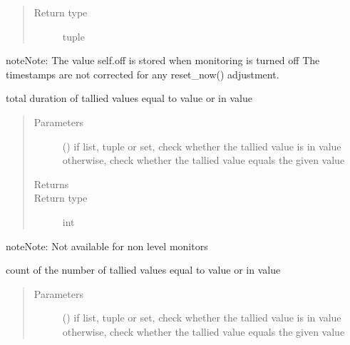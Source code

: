 \documentclass[letterpaper,10pt,english]{sphinxmanual}
\begin{document}
\begin{fulllineitems}
\begin{fulllineitems}
\begin{quote}
\begin{description}
\item[{Return type}] \leavevmode
tuple

\end{description}\end{quote}

\begin{sphinxadmonition}{note}{Note:}
The value self.off is stored when monitoring is turned off 
The timestamps are not corrected for any reset\_now() adjustment.
\end{sphinxadmonition}

\end{fulllineitems}


\begin{fulllineitems}
\label{\detokenize{Reference:salabim.Monitor.value_duration}}
total duration of tallied values equal to value or in value
\begin{quote}\begin{description}
\item[{Parameters}] \leavevmode
{} () \textendash{} if list, tuple or set, check whether the tallied value is in value 
otherwise, check whether the tallied value equals the given value

\item[{Returns}] \leavevmode
{}

\item[{Return type}] \leavevmode
int

\end{description}\end{quote}

\begin{sphinxadmonition}{note}{Note:}
Not available for non level monitors
\end{sphinxadmonition}

\end{fulllineitems}


\begin{fulllineitems}
\label{\detokenize{Reference:salabim.Monitor.value_number_of_entries}}
count of the number of tallied values equal to value or in value
\begin{quote}\begin{description}
\item[{Parameters}] \leavevmode
{} () \textendash{} if list, tuple or set, check whether the tallied value is in value 
otherwise, check whether the tallied value equals the given value


\end{description}
\end{quote}
\end{fulllineitems}
\end{fulllineitems}
\end{document}
